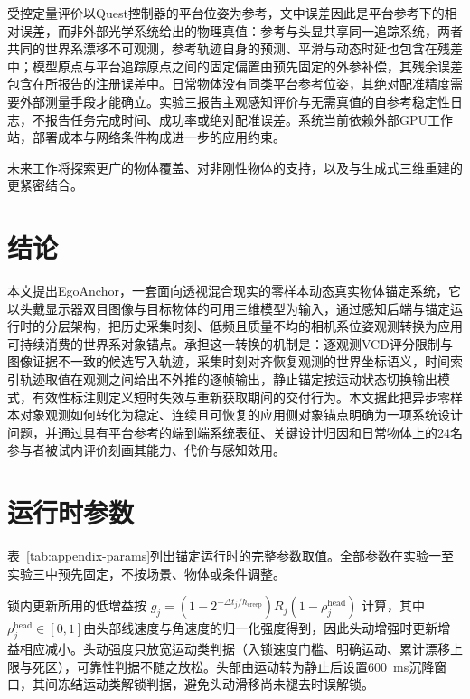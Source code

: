 \documentclass[review]{vgtc}
\begin{document}
受控定量评价以Quest控制器的平台位姿为参考，文中误差因此是平台参考下的相对误差，而非外部光学系统给出的物理真值：参考与头显共享同一追踪系统，两者共同的世界系漂移不可观测，参考轨迹自身的预测、平滑与动态时延也包含在残差中；模型原点与平台追踪原点之间的固定偏置由预先固定的外参补偿，其残余误差包含在所报告的注册误差中。日常物体没有同类平台参考位姿，其绝对配准精度需要外部测量手段才能确立。实验三报告主观感知评价与无需真值的自参考稳定性日志，不报告任务完成时间、成功率或绝对配准误差。系统当前依赖外部GPU工作站，部署成本与网络条件构成进一步的应用约束。

未来工作将探索更广的物体覆盖、对非刚性物体的支持，以及与生成式三维重建的更紧密结合。

\section{结论}\label{sec:conclusion}

本文提出EgoAnchor，一套面向透视混合现实的零样本动态真实物体锚定系统，它以头戴显示器双目图像与目标物体的可用三维模型为输入，通过感知后端与锚定运行时的分层架构，把历史采集时刻、低频且质量不均的相机系位姿观测转换为应用可持续消费的世界系对象锚点。承担这一转换的机制是：逐观测VCD评分限制与图像证据不一致的候选写入轨迹，采集时刻对齐恢复观测的世界坐标语义，时间索引轨迹取值在观测之间给出不外推的逐帧输出，静止锚定按运动状态切换输出模式，有效性标注则定义短时失效与重新获取期间的交付行为。本文据此把异步零样本对象观测如何转化为稳定、连续且可恢复的应用侧对象锚点明确为一项系统设计问题，并通过具有平台参考的端到端系统表征、关键设计归因和日常物体上的24名参与者被试内评价刻画其能力、代价与感知效用。

\raggedbottom




\clearpage
\appendix

\section{运行时参数}\label{sec:appendix}

表~\ref{tab:appendix-params}列出锚定运行时的完整参数取值。全部参数在实验一至实验三中预先固定，不按场景、物体或条件调整。

锁内更新所用的低增益按
$g_j = (1 - 2^{-\Delta t_j / h_{\mathrm{creep}}}) R_j
(1 - \rho_j^{\mathrm{head}})$
计算，其中$\rho_j^{\mathrm{head}} \in [0,1]$由头部线速度与角速度的归一化强度得到，因此头动增强时更新增益相应减小。头动强度只放宽运动类判据（入锁速度门槛、明确运动、累计漂移上限与死区），可靠性判据不随之放松。头部由运动转为静止后设置600~ms沉降窗口，其间冻结运动类解锁判据，避免头动滑移尚未褪去时误解锁。
\end{document}
